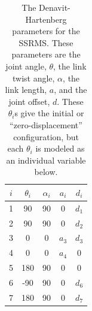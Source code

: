 \documentclass{article}
\begin{document}
\begin{table}[h]
\centering
\begin{tabular}{c|*{4}{c}}
\toprule
$i$ & $\theta_i$ & $\alpha_i$ & $a_i$ & $d_i$ \\
\midrule
1 &  90 & 90 &     0 & $d_1$ \\
2 &  90 & 90 &     0 & $d_2$ \\
3 &   0 &  0 & $a_3$ & $d_3$ \\
4 &   0 &  0 & $a_4$ &     0 \\
5 & 180 & 90 &     0 &     0 \\
6 & -90 & 90 &     0 & $d_6$ \\
7 & 180 & 90 &     0 & $d_7$ \\
\bottomrule
\end{tabular}
\caption{The Denavit-Hartenberg parameters for the SSRMS.
These parameters are the joint angle, $\theta$, the link twist angle, $\alpha$, the link length, $a$, and the joint offset, $d$.
These $\theta_i$s give the initial or ``zero-displacement'' configuration, but each $\theta_i$ is modeled as an individual variable below.}
\label{dhparams}
\end{table}
\end{document}
